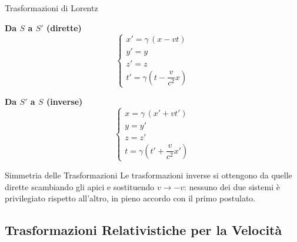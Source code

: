 \begin{formulario}{Trasformazioni di Lorentz}
\begin{minipage}[t]{0.47\textwidth}
\centering \textbf{Da $S$ a $S'$ (dirette)}
\begin{equation*}
    \begin{cases}
        x' = \gamma\,(x - vt) \\
        y' = y \\
        z' = z \\
        t' = \gamma\left(t - \dfrac{v}{c^2}x\right)
    \end{cases}
\end{equation*}
\end{minipage}
\hfill
\begin{minipage}[t]{0.47\textwidth}
\centering \textbf{Da $S'$ a $S$ (inverse)}
\begin{equation*}
    \begin{cases}
        x = \gamma\,(x' + vt') \\
        y = y' \\
        z = z' \\
        t = \gamma\left(t' + \dfrac{v}{c^2}x'\right)
    \end{cases}
\end{equation*}
\end{minipage}
\vspace{4pt}
\end{formulario}

\begin{osservazione}{Simmetria delle Trasformazioni}
Le trasformazioni inverse si ottengono da quelle dirette scambiando gli apici e sostituendo $v \to -v$: nessuno dei due sistemi è privilegiato rispetto all'altro, in pieno accordo con il primo postulato.
\end{osservazione}

\subsection{Trasformazioni Relativistiche per la Velocità}

